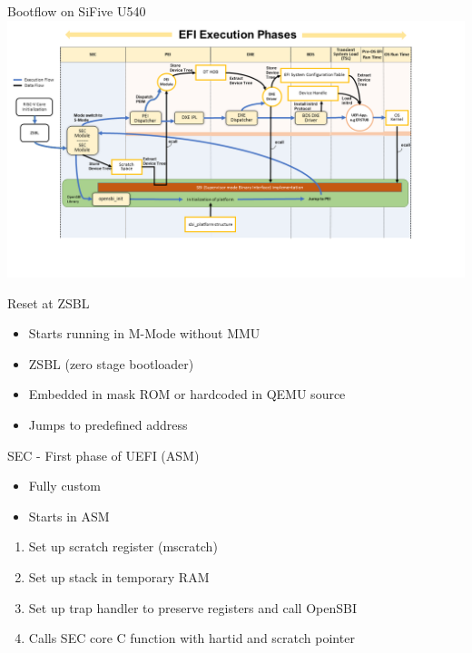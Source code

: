 \documentclass[
  10pt
]{beamer}
\begin{document}
\begin{frame}{Bootflow on SiFive U540}
    \includegraphics[width=1.15\textwidth]{resources/bootflow-annotated.png}
\end{frame}

\begin{frame}{Reset at ZSBL}
  \begin{itemize}
    \item Starts running in M-Mode without MMU
    \item ZSBL (zero stage bootloader)
  \end{itemize}

  \begin{itemize}
    \item Embedded in mask ROM or hardcoded in QEMU source
    \item Jumps to predefined address %
  \end{itemize}
\end{frame}

\begin{frame}{SEC - First phase of UEFI (ASM)}
  \begin{itemize}
    \item Fully custom
    \item Starts in ASM %
  \end{itemize}

  \begin{enumerate}
    \item Set up scratch register (mscratch) %
    \item Set up stack in temporary RAM
    \item Set up trap handler to preserve registers and call OpenSBI
    \item Calls SEC core C function with hartid and scratch pointer
  \end{enumerate}

\end{frame}
\end{document}
